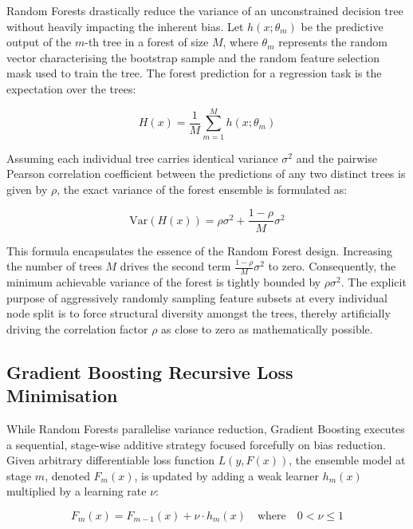 \documentclass[conference]{IEEEtran}
\begin{document}
Random Forests drastically reduce the variance of an unconstrained decision tree without heavily impacting the inherent bias. Let $h(x; \theta_m)$ be the predictive output of the $m$-th tree in a forest of size $M$, where $\theta_m$ represents the random vector characterising the bootstrap sample and the random feature selection mask used to train the tree. The forest prediction for a regression task is the expectation over the trees:

\begin{equation}
H(x) = \frac{1}{M} \sum_{m=1}^M h(x; \theta_m)
\end{equation}

Assuming each individual tree carries identical variance $\sigma^2$ and the pairwise Pearson correlation coefficient between the predictions of any two distinct trees is given by $\rho$, the exact variance of the forest ensemble is formulated as:

\begin{equation}
\text{Var}(H(x)) = \rho \sigma^2 + \frac{1 - \rho}{M} \sigma^2
\end{equation}

This formula encapsulates the essence of the Random Forest design. Increasing the number of trees $M$ drives the second term $\frac{1 - \rho}{M} \sigma^2$ to zero. Consequently, the minimum achievable variance of the forest is tightly bounded by $\rho \sigma^2$. The explicit purpose of aggressively randomly sampling feature subsets at every individual node split is to force structural diversity amongst the trees, thereby artificially driving the correlation factor $\rho$ as close to zero as mathematically possible.

\subsection{Gradient Boosting Recursive Loss Minimisation}

While Random Forests parallelise variance reduction, Gradient Boosting executes a sequential, stage-wise additive strategy focused forcefully on bias reduction. Given arbitrary differentiable loss function $L(y, F(x))$, the ensemble model at stage $m$, denoted $F_m(x)$, is updated by adding a weak learner $h_m(x)$ multiplied by a learning rate $\nu$:

\begin{equation}
F_m(x) = F_{m-1}(x) + \nu \cdot h_m(x) \quad \text{where} \quad 0 < \nu \leq 1
\end{equation}
\end{document}
